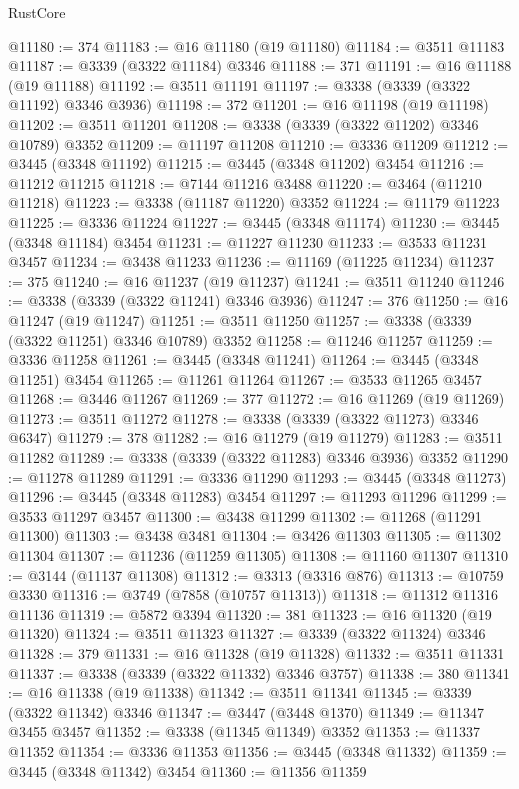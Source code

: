 \begin{lexlean}{RustCore}
\begin{coremodule}
@11180 := 374
@11183 := @16 @11180 (@19 @11180)
@11184 := @3511 @11183
@11187 := @3339 (@3322 @11184) @3346
@11188 := 371
@11191 := @16 @11188 (@19 @11188)
@11192 := @3511 @11191
@11197 := @3338 (@3339 (@3322 @11192) @3346 @3936)
@11198 := 372
@11201 := @16 @11198 (@19 @11198)
@11202 := @3511 @11201
@11208 := @3338 (@3339 (@3322 @11202) @3346 @10789) @3352
@11209 := @11197 @11208
@11210 := @3336 @11209
@11212 := @3445 (@3348 @11192)
@11215 := @3445 (@3348 @11202) @3454
@11216 := @11212 @11215
@11218 := @7144 @11216 @3488
@11220 := @3464 (@11210 @11218)
@11223 := @3338 (@11187 @11220) @3352
@11224 := @11179 @11223
@11225 := @3336 @11224
@11227 := @3445 (@3348 @11174)
@11230 := @3445 (@3348 @11184) @3454
@11231 := @11227 @11230
@11233 := @3533 @11231 @3457
@11234 := @3438 @11233
@11236 := @11169 (@11225 @11234)
@11237 := 375
@11240 := @16 @11237 (@19 @11237)
@11241 := @3511 @11240
@11246 := @3338 (@3339 (@3322 @11241) @3346 @3936)
@11247 := 376
@11250 := @16 @11247 (@19 @11247)
@11251 := @3511 @11250
@11257 := @3338 (@3339 (@3322 @11251) @3346 @10789) @3352
@11258 := @11246 @11257
@11259 := @3336 @11258
@11261 := @3445 (@3348 @11241)
@11264 := @3445 (@3348 @11251) @3454
@11265 := @11261 @11264
@11267 := @3533 @11265 @3457
@11268 := @3446 @11267
@11269 := 377
@11272 := @16 @11269 (@19 @11269)
@11273 := @3511 @11272
@11278 := @3338 (@3339 (@3322 @11273) @3346 @6347)
@11279 := 378
@11282 := @16 @11279 (@19 @11279)
@11283 := @3511 @11282
@11289 := @3338 (@3339 (@3322 @11283) @3346 @3936) @3352
@11290 := @11278 @11289
@11291 := @3336 @11290
@11293 := @3445 (@3348 @11273)
@11296 := @3445 (@3348 @11283) @3454
@11297 := @11293 @11296
@11299 := @3533 @11297 @3457
@11300 := @3438 @11299
@11302 := @11268 (@11291 @11300)
@11303 := @3438 @3481
@11304 := @3426 @11303
@11305 := @11302 @11304
@11307 := @11236 (@11259 @11305)
@11308 := @11160 @11307
@11310 := @3144 (@11137 @11308)
@11312 := @3313 (@3316 @876)
@11313 := @10759 @3330
@11316 := @3749 (@7858 (@10757 @11313))
@11318 := @11312 @11316 @11136
@11319 := @5872 @3394
@11320 := 381
@11323 := @16 @11320 (@19 @11320)
@11324 := @3511 @11323
@11327 := @3339 (@3322 @11324) @3346
@11328 := 379
@11331 := @16 @11328 (@19 @11328)
@11332 := @3511 @11331
@11337 := @3338 (@3339 (@3322 @11332) @3346 @3757)
@11338 := 380
@11341 := @16 @11338 (@19 @11338)
@11342 := @3511 @11341
@11345 := @3339 (@3322 @11342) @3346
@11347 := @3447 (@3448 @1370)
@11349 := @11347 @3455 @3457
@11352 := @3338 (@11345 @11349) @3352
@11353 := @11337 @11352
@11354 := @3336 @11353
@11356 := @3445 (@3348 @11332)
@11359 := @3445 (@3348 @11342) @3454
@11360 := @11356 @11359

\end{coremodule}
\end{lexlean}
